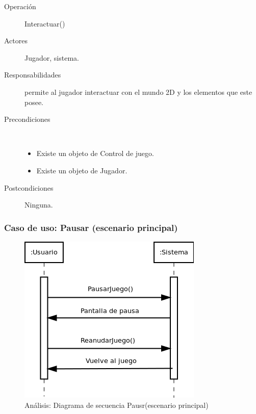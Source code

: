 \begin{description}
    \item [Operación] Interactuar()
    \item [Actores] Jugador, sistema.
    \item [Responsabilidades] permite al jugador interactuar con el mundo 2D y los elementos que este posee.
    \item [Precondiciones] $\quad$
        \begin{itemize}
            \item Existe un objeto de Control de juego.
            \item Existe un objeto de Jugador.
        \end{itemize}
    \item [Postcondiciones] Ninguna.
\end{description}

\subsubsection{Caso de uso: Pausar (escenario principal)}

\begin{figure}[H] 
  \label{secuencia_pausar1}
  \begin{center}
    \includegraphics[scale=0.6]{imagenes/analisis/secuencia_pausar1.png}
  \end{center}
  \caption{Análisis: Diagrama de secuencia Pausr(escenario principal)}
\end{figure}

